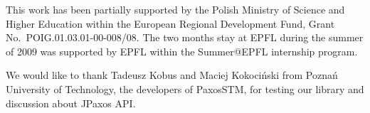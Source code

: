 This work has been partially supported by the Polish Ministry of Science and
Higher Education within the European Regional Development Fund, Grant No.\
POIG.01\-.03\-.01-00-008/08. The two months stay at EPFL during the summer of 2009
was supported by EPFL within the Summer@EPFL internship program.

We would like to thank Tadeusz Kobus and Maciej Kokociński from Poznań University
of Technology, the developers of PaxosSTM, for testing our library and
discussion about JPaxos API.

\cleardoublepage
